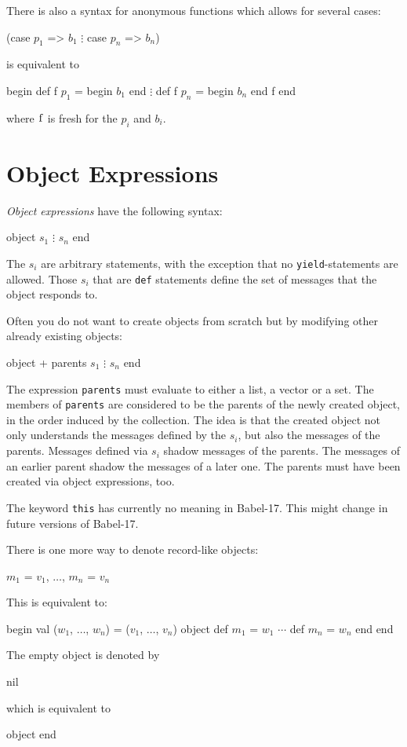 \documentclass[11pt]{amsart}
\newcommand{\babelsrc}[1] {\lstinline!#1!}
\begin{document}
There is also a syntax for anonymous functions which allows for several cases:
\begin{babellisting}
(case $p_1$ => $b_1$
    $\vdots$
 case $p_n$ => $b_n$)
\end{babellisting}
is equivalent to 
\begin{babellisting}
begin
  def f $p_1$ = begin $b_1$ end
    $\vdots$
  def f $p_n$ = begin $b_n$ end
  f
end
\end{babellisting}
where $\babelsrc{f}$ is fresh for the $p_i$ and $b_i$.

\section{Object Expressions}
\emph{Object expressions} have the following syntax:
\begin{babellisting}
object 
  $s_1$
  $\vdots$
  $s_n$
end
\end{babellisting}
The $s_i$ are arbitrary statements, with the exception that no \babelsrc{yield}-statements are allowed.  Those $s_i$ that are  \babelsrc{def} statements define the set of messages that the object responds to.

Often you do not want to create objects from scratch but by modifying other already existing objects:
\begin{babellisting}
object + parents
  $s_1$
  $\vdots$
  $s_n$
end
\end{babellisting}
The expression \babelsrc{parents} must evaluate to either a list, a vector or a set. The members of  \babelsrc{parents}
are considered to be the parents of the newly created object, in the order induced by the collection. The idea is that the created object not only understands the messages defined by the $s_i$, but also the messages of the parents. Messages defined via $s_i$ shadow messages of the parents. The messages of an earlier parent shadow the messages of a later one. The parents must have been created via object expressions, too. 

The keyword \babelsrc{this} has currently no meaning in Babel-17. This might change in future versions of Babel-17.

\noindent There is one more way to denote record-like objects:
\begin{babellisting}
{ $m_1$ = $v_1$, $\ldots$, $m_n$ = $v_n$ }
\end{babellisting}
This is equivalent to:
\begin{babellisting}
begin
  val ($w_1$, $\ldots$, $w_n$) = ($v_1$, $\ldots$, $v_n$)
  object
    def $m_1$ = $w_1$
    $\cdots$
    def $m_n$ = $w_n$
  end
end
\end{babellisting}
The empty object is denoted by
\begin{babellisting}
nil
\end{babellisting}
which is equivalent to
\begin{babellisting}
object end
\end{babellisting}
\end{document}
